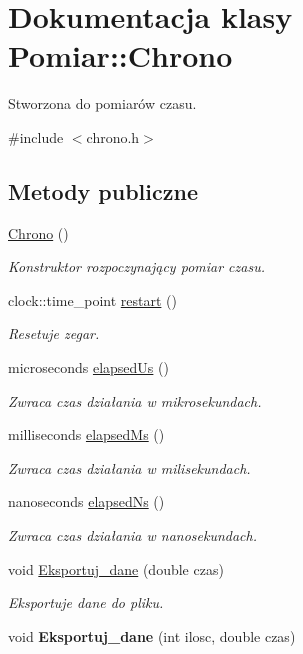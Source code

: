 \hypertarget{class_pomiar_1_1_chrono}{\section{\-Dokumentacja klasy \-Pomiar\-:\-:\-Chrono}
\label{class_pomiar_1_1_chrono}
}


\-Stworzona do pomiarów czasu.  




{\ttfamily \#include $<$chrono.\-h$>$}

\subsection*{\-Metody publiczne}
\begin{DoxyCompactItemize}
\item 
\hyperlink{class_pomiar_1_1_chrono_a2abf3698fb974851c874747006bc1704}{\-Chrono} ()
\begin{DoxyCompactList}\small\item\em \-Konstruktor rozpoczynający pomiar czasu. \end{DoxyCompactList}\item 
clock\-::time\-\_\-point \hyperlink{class_pomiar_1_1_chrono_aa21c2b5c1e13e8f004af76472b0e81fc}{restart} ()
\begin{DoxyCompactList}\small\item\em \-Resetuje zegar. \end{DoxyCompactList}\item 
microseconds \hyperlink{class_pomiar_1_1_chrono_a58f1b51571c6ce87d173639ff03f3664}{elapsed\-Us} ()
\begin{DoxyCompactList}\small\item\em \-Zwraca czas działania w mikrosekundach. \end{DoxyCompactList}\item 
milliseconds \hyperlink{class_pomiar_1_1_chrono_a5f52e691a6319f46ee7db3bd5263541a}{elapsed\-Ms} ()
\begin{DoxyCompactList}\small\item\em \-Zwraca czas działania w milisekundach. \end{DoxyCompactList}\item 
nanoseconds \hyperlink{class_pomiar_1_1_chrono_ae0c2f8399cce3432c979a405ba0a7cc0}{elapsed\-Ns} ()
\begin{DoxyCompactList}\small\item\em \-Zwraca czas działania w nanosekundach. \end{DoxyCompactList}\item 
void \hyperlink{class_pomiar_1_1_chrono_a0d2a729f4887e8a1eae57007908baf23}{\-Eksportuj\-\_\-dane} (double czas)
\begin{DoxyCompactList}\small\item\em \-Eksportuje dane do pliku. \end{DoxyCompactList}\item 
\hypertarget{class_pomiar_1_1_chrono_a6d6d15e45c22f1967949ca534a6b62a3}{void {\bfseries \-Eksportuj\-\_\-dane} (int ilosc, double czas)}\label{class_pomiar_1_1_chrono_a6d6d15e45c22f1967949ca534a6b62a3}

\end{DoxyCompactItemize}


